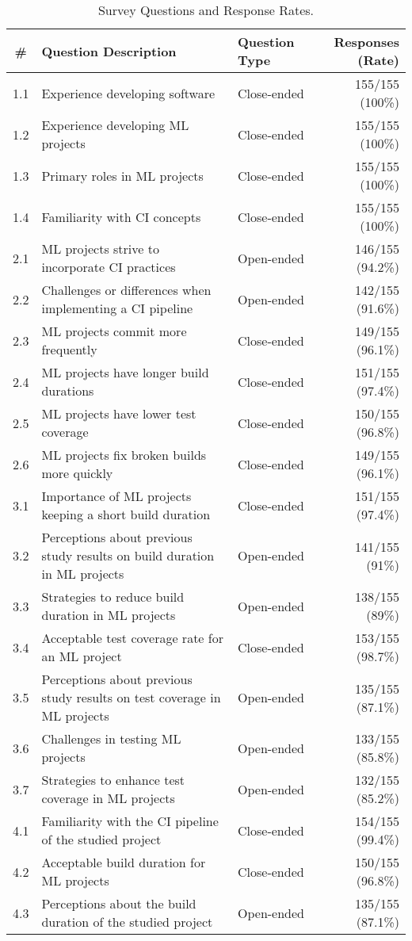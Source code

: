\begin{table}
\centering
\caption{Survey Questions and Response Rates.}
\label{tab:response_rates}
\begin{tabular}{cp{6cm}lr}
\toprule
\textbf{\#} & \textbf{Question Description} & \textbf{Question Type} & \textbf{Responses (Rate)} \\
\midrule
1.1 & Experience developing software & Close-ended & 155/155 (100\%) \\
1.2 & Experience developing ML projects & Close-ended & 155/155 (100\%) \\
1.3 & Primary roles in ML projects & Close-ended & 155/155 (100\%) \\
1.4 & Familiarity with CI concepts & Close-ended & 155/155 (100\%) \\
2.1 & ML projects strive to incorporate CI practices & Open-ended & 146/155 (94.2\%) \\
2.2 & Challenges or differences when implementing a CI pipeline & Open-ended & 142/155 (91.6\%) \\
2.3 & ML projects commit more frequently & Close-ended & 149/155 (96.1\%) \\
2.4 & ML projects have longer build durations & Close-ended & 151/155 (97.4\%) \\
2.5 & ML projects have lower test coverage & Close-ended & 150/155 (96.8\%) \\
2.6 & ML projects fix broken builds more quickly & Close-ended & 149/155 (96.1\%) \\
3.1 & Importance of ML projects keeping a short build duration & Close-ended & 151/155 (97.4\%) \\
3.2 & Perceptions about previous study results on build duration in ML projects & Open-ended & 141/155 (91\%) \\
3.3 & Strategies to reduce build duration in ML projects & Open-ended & 138/155 (89\%) \\
3.4 & Acceptable test coverage rate for an ML project & Close-ended & 153/155 (98.7\%) \\
3.5 & Perceptions about previous study results on test coverage in ML projects & Open-ended & 135/155 (87.1\%) \\
3.6 & Challenges in testing ML projects & Open-ended & 133/155 (85.8\%) \\
3.7 & Strategies to enhance test coverage in ML projects & Open-ended & 132/155 (85.2\%) \\
4.1 & Familiarity with the CI pipeline of the studied project & Close-ended & 154/155 (99.4\%) \\
4.2 & Acceptable build duration for ML projects & Close-ended & 150/155 (96.8\%) \\
4.3 & Perceptions about the build duration of the studied project & Open-ended & 135/155 (87.1\%) \\
\bottomrule
\end{tabular}
\end{table}


